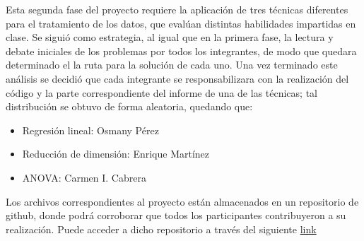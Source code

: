 \documentclass[a4paper,10pt,twocolumn]{article}
\begin{document}
Esta segunda fase del proyecto requiere la aplicación de tres técnicas diferentes para el tratamiento de los datos, que evalúan distintas habilidades impartidas en clase. Se siguió como estrategia, al igual que en la primera fase, la lectura y debate iniciales de los problemas por todos los integrantes, de modo que quedara determinado el la ruta para la solución de cada uno. Una vez terminado este análisis se decidió que cada integrante se responsabilizara con la realización del código y la parte correspondiente del informe de una de las técnicas; tal distribución se obtuvo de forma aleatoria, quedando que:
\begin{itemize}
    \item Regresión lineal: Osmany Pérez
    \item Reducción de dimensión: Enrique Martínez
    \item ANOVA: Carmen I. Cabrera
\end{itemize}

Los archivos correspondientes al proyecto están almacenados en un repositorio de github, donde podrá corroborar que todos los participantes contribuyeron a su realización. Puede acceder a dicho repositorio a través del siguiente \href{https://github.com/codersUP/statistics-project-2}{link}










\label{end}
\end{document}
